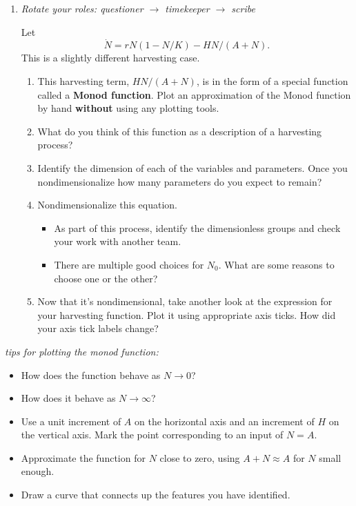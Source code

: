 \documentclass[12pt]{amsart}
\theoremstyle{conjecture}
\theoremstyle{definition}
\theoremstyle{question}
\theoremstyle{theorem}
\begin{document}
\begin{enumerate}
        \item \textit{Rotate your roles: questioner $\rightarrow$ timekeeper $\rightarrow$ scribe}

        Let
        \[
            \dot N = rN(1-N/K)-HN/(A+N).
        \]
        This is a slightly different harvesting case.

        \begin{enumerate}
            \item This harvesting term, $HN/(A+N)$, is in the form of a special function called a
            \textbf{Monod function}. Plot an approximation of the Monod function by hand
            \textbf{without} using any plotting tools.

            \item What do you think of this function as a description of a harvesting process?

            \item Identify the dimension of each of the variables and parameters. Once you nondimensionalize
            how many parameters do you expect to remain?

            \item Nondimensionalize this equation.

            \begin{itemize}
                \item As part of this process, identify the dimensionless groups and check your work with
                another team.

                \item There are multiple good choices for $N_0$. What are some reasons to choose one or the
                other?
            \end{itemize}

            \item Now that it's nondimensional, take another look at the expression for your harvesting
            function. Plot it using appropriate axis ticks. How did your axis tick labels change?
        \end{enumerate}
    \end{enumerate}

    \textit{tips for plotting the monod function:}

    \begin{itemize}
        \item How does the function behave as $N\to0$?

        \item How does it behave as $N\to\infty$?

        \item Use a unit increment of $A$ on the horizontal axis and an increment of $H$ on the vertical
        axis. Mark the point corresponding to an input of $N=A$.

        \item Approximate the function for $N$ close to zero, using $A+N\approx A$ for $N$ small enough.

        \item Draw a curve that connects up the features you have identified.
    \end{itemize}
\end{document}
